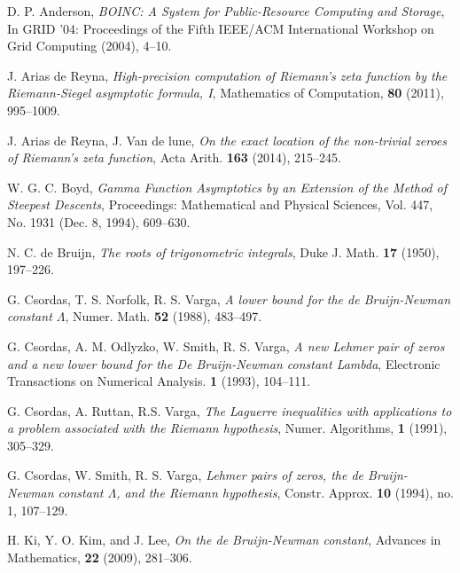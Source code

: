 \documentclass[a4paper,11pt,twoside]{amsart}
\begin{document}
\begin{thebibliography}{99} 

D. P. Anderson, \emph{BOINC: A System for Public-Resource Computing and Storage}, In GRID '04: Proceedings of the Fifth IEEE/ACM International Workshop on Grid Computing (2004), 4--10.

J. Arias de Reyna, \emph{High-precision computation of Riemann's zeta function by the Riemann-Siegel asymptotic formula, I}, Mathematics of Computation, \textbf{80} (2011), 995--1009.

J. Arias de Reyna, J. Van de lune, \emph{On the exact location of the non-trivial zeroes of Riemann's zeta function}, Acta Arith. \textbf{163} (2014), 215--245.

W. G. C. Boyd, \emph{Gamma Function Asymptotics by an Extension of the Method of Steepest Descents}, Proceedings: Mathematical and Physical Sciences, Vol. 447, No. 1931 (Dec. 8, 1994), 609--630.

N. C. de Bruijn, \emph{The roots of trigonometric integrals}, Duke J. Math. \textbf{17} (1950), 197--226.

%

G. Csordas, T. S. Norfolk, R. S. Varga, \emph{A lower bound for the de Bruijn-Newman constant $\Lambda$}, Numer. Math. \textbf{52} (1988), 483--497.

G. Csordas, A. M. Odlyzko, W. Smith, R. S. Varga, \emph{A new Lehmer pair of zeros and a new lower bound for the De Bruijn-Newman constant Lambda}, Electronic Transactions on Numerical Analysis. \textbf{1} (1993), 104--111.

G. Csordas, A. Ruttan, R.S. Varga, \emph{The Laguerre inequalities with applications
to a problem associated with the Riemann hypothesis}, Numer. Algorithms, \textbf{1} (1991), 305--329.

G. Csordas, W. Smith, R. S. Varga, \emph{Lehmer pairs of zeros, the de Bruijn-Newman constant $\Lambda$, and the Riemann hypothesis},  Constr. Approx. \textbf{10} (1994), no. 1, 107--129. 

H. Ki, Y. O. Kim, and J. Lee, \emph{On the de Bruijn-Newman constant}, Advances in Mathematics, \textbf{22} (2009), 281--306.


\end{thebibliography}
\end{document}
